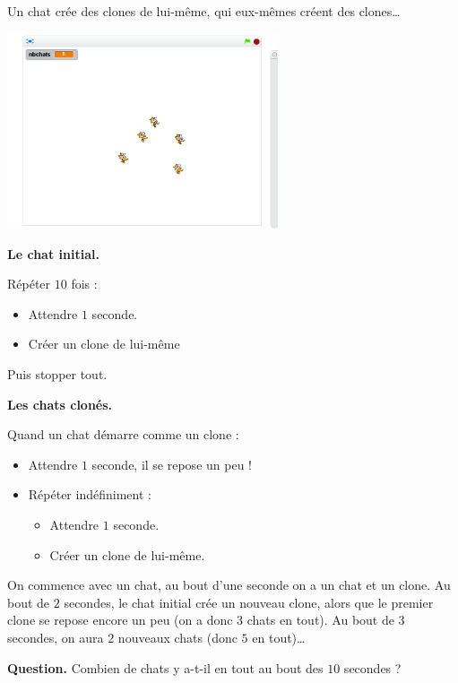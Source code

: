 \documentclass[class=report,crop=false, 12pt]{standalone}
\begin{document}
\begin{enigme}

Un chat crée des clones de lui-même, qui eux-mêmes créent des clones\ldots
\begin{center}
  \includegraphics[width=0.6\textwidth]{ecran-08-eg2} 
\end{center}

\textbf{Le chat initial.}

Répéter $10$ fois :
\begin{itemize}
  \item Attendre $1$ seconde.
  \item Créer un clone de lui-même
\end{itemize}
Puis stopper tout.


\bigskip

\textbf{Les chats clonés.}

Quand un chat démarre comme un clone :
\begin{itemize}
  \item Attendre $1$ seconde, il se repose un peu !
  \item Répéter indéfiniment :
  \begin{itemize}
    \item Attendre $1$ seconde.
    \item Créer un clone de lui-même.
  \end{itemize}
\end{itemize}
  
\bigskip

On commence avec un chat, au bout d'une seconde
on a un chat et un clone. Au bout de $2$ secondes, le chat initial crée un nouveau clone, alors que le premier clone se repose encore un peu (on a donc $3$ chats en tout).
Au bout de $3$ secondes, on aura $2$ nouveaux chats (donc $5$ en tout)\ldots

\bigskip

\textbf{Question.} Combien de chats y a-t-il en tout au bout des $10$ secondes ?
\bigskip


\end{enigme}
\end{document}
